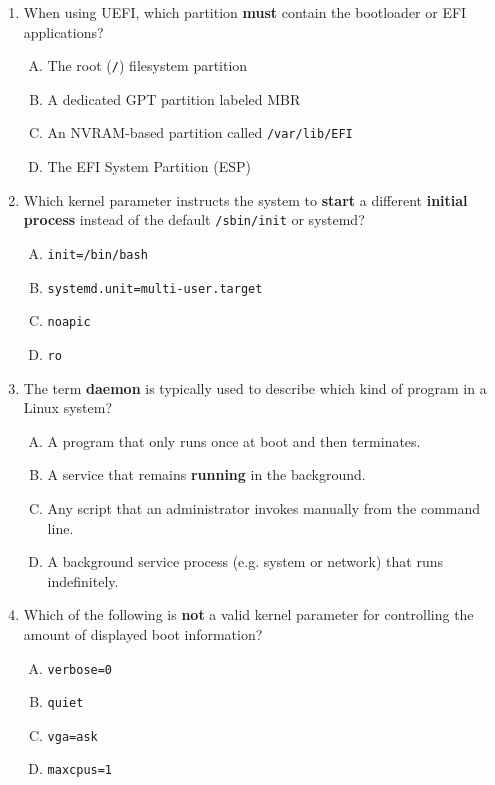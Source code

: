 \documentclass[a4paper]{report}
\begin{document}
\begin{enumerate}[1.]
    \item When using UEFI, which partition \textbf{must} contain the bootloader or EFI applications?
      \begin{enumerate}[A)]
        \item The root (\texttt{/}) filesystem partition
        \item A dedicated GPT partition labeled \textquotedbl{}MBR\textquotedbl{}
        \item An NVRAM-based partition called \texttt{/var/lib/EFI}
        \item The EFI System Partition (ESP)
      \end{enumerate}
    
    \item Which kernel parameter instructs the system to \textbf{start} a different \textbf{initial process} instead of the default \texttt{/sbin/init} or systemd?
      \begin{enumerate}[A)]
        \item \texttt{init=/bin/bash}
        \item \texttt{systemd.unit=multi-user.target}
        \item \texttt{noapic}
        \item \texttt{ro}
      \end{enumerate}
    
    \item The term \textbf{daemon} is typically used to describe which kind of program in a Linux system?
      \begin{enumerate}[A)]
        \item A program that only runs once at boot and then terminates.
        \item A service that remains \textbf{running} in the background.
        \item Any script that an administrator invokes manually from the command line.
        \item A background service process (e.g. system or network) that runs indefinitely.
      \end{enumerate}
    
    \item Which of the following is \textbf{not} a valid kernel parameter for controlling the amount of displayed boot information?
      \begin{enumerate}[A)]
        \item \texttt{verbose=0}
        \item \texttt{quiet}
        \item \texttt{vga=ask}
        \item \texttt{maxcpus=1}
      \end{enumerate}
    

\end{enumerate}
\end{document}

